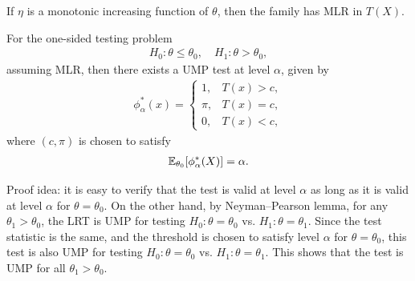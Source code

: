 \documentclass[11pt,letterpaper]{article}
\numberwithin{theorem}{lecture}
\numberwithin{proposition}{lecture}
\numberwithin{lemma}{lecture}
\numberwithin{claim}{lecture}
\numberwithin{corollary}{lecture}
\numberwithin{definition}{lecture}
\numberwithin{conjecture}{lecture}
\numberwithin{remark}{lecture}
\numberwithin{example}{lecture}
\numberwithin{equation}{lecture}
\begin{document}
If $\eta$ is a monotonic increasing function of $\theta$, then the family has MLR in $T (X)$.
\begin{theorem}
  For the one-sided testing problem
  \begin{align*}
    H_0: \theta \leq \theta_0, \quad H_1: \theta > \theta_0,
  \end{align*}
  assuming MLR, then there exists a UMP test at level $\alpha$, given by
  \begin{align*}
    \phi^*_\alpha (x) = \begin{cases}
      1, & T (x) > c,\\
      \pi, & T (x) = c,\\
      0, & T (x) < c,
    \end{cases}
  \end{align*}
  where $(c, \pi)$ is chosen to satisfy
  \begin{align*}
    {\mathbb{E}}_{\theta_0} [\phi^*_\alpha (X)] = \alpha.
  \end{align*}
\end{theorem}
Proof idea: it is easy to verify that the test is valid at level $\alpha$ as long as it is valid at level $\alpha$ for $\theta = \theta_0$. On the other hand, by Neyman--Pearson lemma, for any $\theta_1 > \theta_0$, the LRT is UMP for testing $H_0: \theta = \theta_0$ vs. $H_1: \theta = \theta_1$. Since the test statistic is the same, and the threshold is chosen to satisfy level $\alpha$ for $\theta = \theta_0$, this test is also UMP for testing $H_0: \theta = \theta_0$ vs. $H_1: \theta = \theta_1$. This shows that the test is UMP for all $\theta_1 > \theta_0$.
\end{document}

